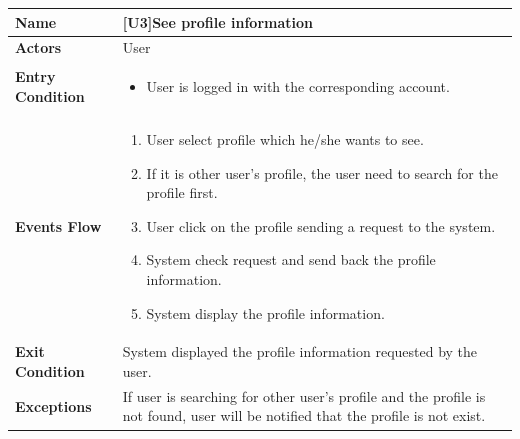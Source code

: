 \begin{center}
    \begin{tabular}{|p{9em}|p{27em}|}
        \hline
        \rowcolor{bluepoli!40} %
        \textbf{Name} & \textbf{[U3]See profile information} \\
        \hline
        \textbf{Actors} & User \\
        \hline
        \textbf{Entry Condition} & 
        \begin{itemize}
            \item User is logged in with the corresponding account.
        \end{itemize} \\
        \hline
        \textbf{Events Flow} & 
        \begin{enumerate}
            \item User select profile which he/she wants to see.
            \item If it is other user's profile, the user need to search for the profile first.
            \item User click on the profile sending a request to the system.
            \item System check request and send back the profile information.
            \item System display the profile information.
        \end{enumerate} \\
        \hline
        \textbf{Exit Condition} & 
            System displayed the profile information requested by the user.\\
        \hline
        \textbf{Exceptions} &
            If user is searching for other user's profile and the profile is not found, user will be notified that the profile is not exist.\\
        \hline
    \end{tabular}
\end{center}

